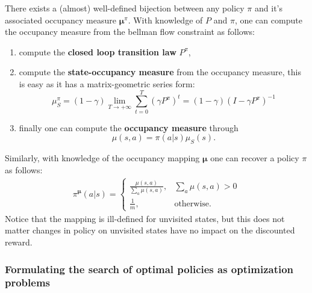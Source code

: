\begin{observation}
    \label{obs:policy_occupancy_bijection}
    There exists a (almost) well-defined bijection between any policy $\pi$ and it's associated occupancy measure $\bm{\mu}^\pi$. With knowledge of $P$ and $\pi$, one can compute the occupancy measure from the bellman flow constraint as follows:
    \begin{enumerate}
        \item compute the \textbf{closed loop transition law} $P^\pi$,
        \item compute the \textbf{state-occupancy measure} from the occupancy measure, this is easy as it has a matrix-geometric series form:
        \[  \mu^\pi_S = (1-\gamma) \lim_{T \rightarrow + \infty} \sum_{t=0}^T  (\gamma P^\pi)^t = (1-\gamma) (I - \gamma P^\pi)^{-1} \]
        \item finally one can compute the \textbf{occupancy measure} through
        \[ \mu(s,a) = \pi(a|s)\mu_S(s).\]
    \end{enumerate}
    Similarly, with knowledge of the occupancy mapping $\bm{\mu}$ one can recover a policy $\pi$ as follows:
    \begin{align*}
        \pi^{\bm{\mu}}(a|s)= \begin{cases}
            \frac{\mu(s,a)}{\sum_a\mu(s,a)}, &  \sum_a \mu(s,a) > 0\\
            \frac{1}{m}, & \text{otherwise}.
        \end{cases}
    \end{align*}
    Notice that the mapping is ill-defined for unvisited states, but this does not matter changes in policy on unvisited states have no impact on the discounted reward.
\end{observation}

\subsubsection{Formulating the search of optimal policies as optimization problems} \label{sec:opt_sol_mdp}

